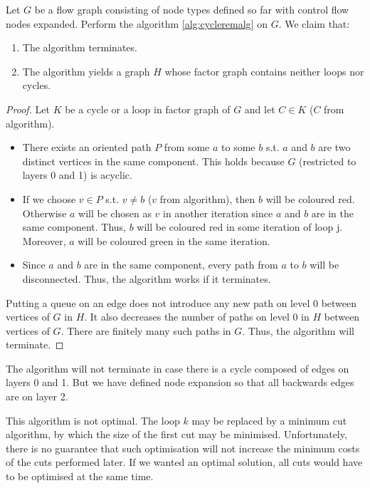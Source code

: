   Let $G$ be a flow graph consisting of node types defined so far with control flow nodes expanded. Perform the algorithm \ref{alg:cycleremalg} on $G$. We claim that:
  \begin{enumerate}
    \item The algorithm terminates.
    \item The algorithm yields a graph $H$ whose factor graph contains neither loops nor cycles.
  \end{enumerate}
  \begin{proof}
    Let $K$ be a cycle or a loop in factor graph of $G$ and let $C \in K$ ($C$ from algorithm).
    \begin{itemize}
      \item There exists an oriented path $P$ from some $a$ to some $b$ s.t. $a$ and $b$ are two distinct vertices in the same component. This holds because $G$ (restricted to layers 0 and 1) is acyclic.
      \item If we choose $v \in P$ s.t. $v \neq b$ ($v$ from algorithm), then $b$ will be coloured red. Otherwise $a$ will be chosen as $v$ in another iteration since $a$ and $b$ are in the same component. Thus, $b$ will be coloured red in some iteration of loop j.  Moreover, $a$ will be coloured green in the same iteration.
      \item Since $a$ and $b$ are in the same component, every path from $a$ to $b$ will be disconnected. Thus, the algorithm works if it terminates. 
    \end{itemize}
      Putting a queue on an edge does not introduce any new path on level 0 between vertices of $G$ in $H$. It also decreases the number of paths on level 0 in $H$ between vertices of $G$. There are finitely many such paths in $G$. Thus, the algorithm will terminate.
  \end{proof}
\myendclaim

\begin{rem}
  The algorithm will not terminate in case there is a cycle composed of edges on layers 0 and 1. But we have defined node expansion so that all backwards edges are on layer 2.
\end{rem}

This algorithm is not optimal. The loop $k$ may be replaced by a minimum cut algorithm, by which the size of the first cut may be minimised. Unfortunately, there is no guarantee that such optimisation will not increase the minimum costs of the cuts performed later. If we wanted an optimal solution, all cuts would have to be optimised at the same time. 


